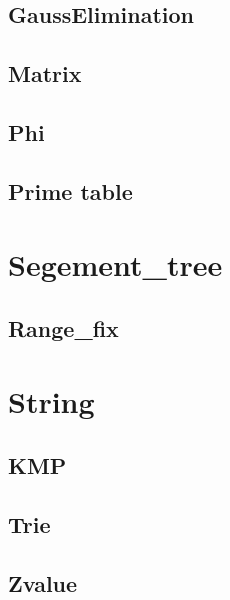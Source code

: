 \subsection{GaussElimination}

\subsection{Matrix}

\subsection{Phi}

\subsection{Prime table}


\section{Segement_tree}
\subsection{Range_fix}


\section{String}

\subsection{KMP}

\subsection{Trie}

\subsection{Zvalue}
